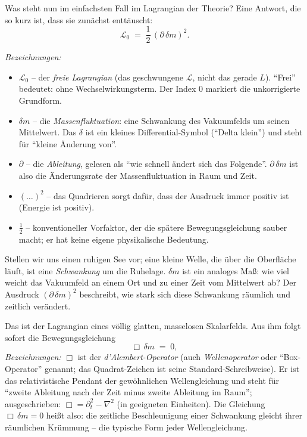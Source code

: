 Was steht nun im einfachsten Fall im Lagrangian der Theorie? Eine
Antwort, die so kurz ist, dass sie zunächst enttäuscht:
\[
  \mathcal{L}_0 \;=\; \frac{1}{2}\,(\partial\,\delta m)^2.
\]

\noindent\textit{Bezeichnungen:}
\begin{itemize}\setlength\itemsep{0pt}
  \item $\mathcal{L}_0$ -- der \emph{freie Lagrangian} (das geschwungene
        $\mathcal{L}$, nicht das gerade $L$). \enquote{Frei} bedeutet:
        ohne Wechselwirkungsterm. Der Index $0$ markiert die unkorrigierte
        Grundform.
  \item $\delta m$ -- die \emph{Massenfluktuation}: eine Schwankung des
        Vakuumfelds um seinen Mittelwert. Das $\delta$ ist ein
        kleines Differential-Symbol (\enquote{Delta klein}) und steht
        für \enquote{kleine Änderung von}.
  \item $\partial$ -- die \emph{Ableitung}, gelesen als \enquote{wie schnell
        ändert sich das Folgende}. $\partial\,\delta m$ ist also
        die Änderungsrate der Massenfluktuation in Raum und Zeit.
  \item $(\ldots)^2$ -- das Quadrieren sorgt dafür, dass der Ausdruck
        immer positiv ist (Energie ist positiv).
  \item $\tfrac{1}{2}$ -- konventioneller Vorfaktor, der die spätere
        Bewegungsgleichung sauber macht; er hat keine eigene physikalische
        Bedeutung.
\end{itemize}

\medskip\noindent
Stellen wir uns einen ruhigen See vor; eine kleine Welle, die über
die Oberfläche läuft, ist eine \emph{Schwankung} um die Ruhelage.
$\delta m$ ist ein analoges Maß: wie viel weicht das Vakuumfeld an
einem Ort und zu einer Zeit vom Mittelwert ab? Der Ausdruck
$(\partial\,\delta m)^2$ beschreibt, wie stark sich diese Schwankung
räumlich und zeitlich verändert.

Das ist der Lagrangian eines völlig glatten, masselosen Skalarfelds.
Aus ihm folgt sofort die Bewegungsgleichung
\[
  \Box\,\delta m \;=\; 0,
\]
\noindent\textit{Bezeichnungen:}
$\Box$ ist der \emph{d'Alembert-Operator} (auch \emph{Wellenoperator}
oder \enquote{Box-Operator} genannt; das Quadrat-Zeichen ist seine
Standard-Schreibweise). Er ist das relativistische Pendant der
gewöhnlichen Wellengleichung und steht für \enquote{zweite Ableitung
nach der Zeit minus zweite Ableitung im Raum}; ausgeschrieben:
$\Box = \partial_t^2 - \nabla^2$ (in geeigneten Einheiten). Die
Gleichung $\Box\,\delta m = 0$ heißt also: die zeitliche Beschleunigung
einer Schwankung gleicht ihrer räumlichen Krümmung -- die typische
Form jeder Wellengleichung.

